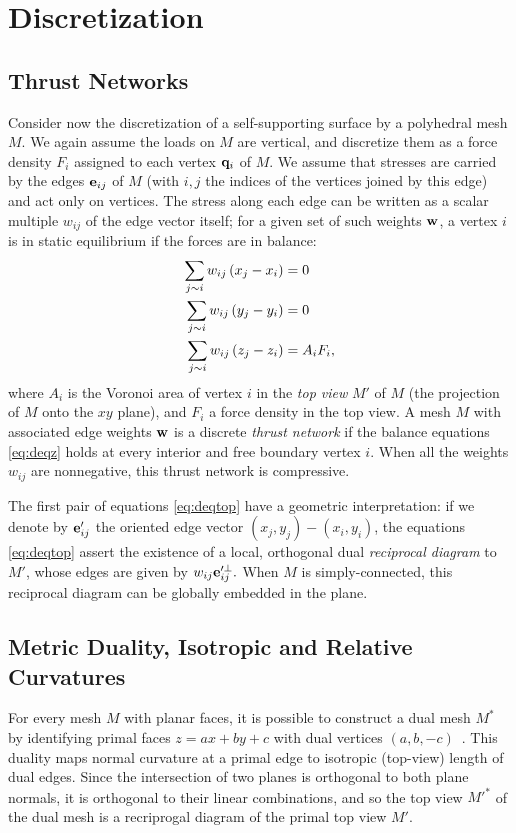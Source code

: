 \documentclass[annual]{acmsiggraph}
\begin{document}
\section{Discretization} \label{sec:discrete}

\subsection{Thrust Networks}

Consider now the discretization of a self-supporting surface by a polyhedral mesh $M$. We again assume the loads on $M$ are vertical, and discretize them as a force density $F_i$ assigned to each vertex ${\mathbf q}_i$ of $M$. We assume that stresses are carried by the edges ${\mathbf e}_{ij}$ of $M$ (with $i,j$ the indices of the vertices joined by this edge) and act only on vertices. The stress along each edge can be written as a scalar multiple $w_{ij}$ of the edge vector itself; for a given set of such weights ${\mathbf w}$, a vertex $i$ is in static equilibrium if the forces are in balance:
\begin{align}
\sum_{j \sim i} w_{ij} \left(x_j - x_i\right) &= 0\notag \\
\sum_{j \sim i} w_{ij} \left(y_j - y_i\right) &= 0 \label{eq:deqtop} \\
\sum_{j \sim i} w_{ij} \left(z_j - z_i\right) &= A_i F_i, \label{eq:deqz}
\end{align}
where $A_i$ is the Voronoi area of vertex $i$ in the \emph{top view} $M'$ of $M$ (the projection of $M$ onto the $xy$ plane), and $F_i$ a force density in the top view. A mesh $M$ with associated edge weights ${\mathbf w}$ is a discrete \emph{thrust network} if the balance equations \eqref{eq:deqz} holds at every interior and free boundary vertex $i$. When all the weights $w_{ij}$ are nonnegative, this thrust network is compressive.

The first pair of equations \eqref{eq:deqtop} have a geometric interpretation: if we denote by ${\mathbf e}'_{ij}$ the oriented edge vector $(x_j, y_j) - (x_i, y_i)$, the equations \eqref{eq:deqtop} assert the existence of a local, orthogonal dual \emph{reciprocal diagram} to $M'$, whose edges are given by $w_{ij} {\mathbf e}'^{\perp}_{ij}.$ When $M$ is simply-connected, this reciprocal diagram can be globally embedded in the plane.

\subsection{Metric Duality, Isotropic and Relative Curvatures}
For every mesh $M$ with planar faces, it is possible to construct a dual mesh $M^*$ by identifying primal faces $z = ax + by + c$ with dual vertices $(a,b,-c)$~\cite{Maxwell64}. This duality maps normal curvature at a primal edge to isotropic (top-view) length of dual edges. Since the intersection of two planes is orthogonal to both plane normals, it is orthogonal to their linear combinations, and so the top view $M'^{*}$ of the dual mesh is a recriprogal diagram of the primal top view $M'$. 
\end{document}
